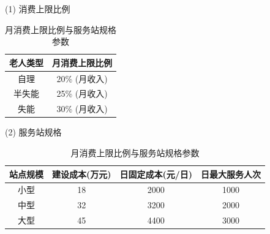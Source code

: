 \begin{table}[h]
\centering
\caption{月消费上限比例与服务站规格参数}

\vspace{0.3cm}

(1) 消费上限比例\\
\begin{tabular}{|c|c|}
\hline
老人类型 & 月消费上限比例 \\
\hline
自理 & 20\% (月收入) \\
半失能 & 25\% (月收入) \\
失能 & 30\% (月收入) \\
\hline
\end{tabular}

\vspace{0.3cm}

(2) 服务站规格\\
\begin{tabular}{|c|c|c|c|}
\hline
站点规模 & 建设成本(万元) & 日固定成本(元/日) & 日最大服务人次 \\
\hline
小型 & 18 & 2000 & 1000 \\
中型 & 32 & 3200 & 2000 \\
大型 & 45 & 4400 & 3000 \\
\hline
\end{tabular}
\end{table}